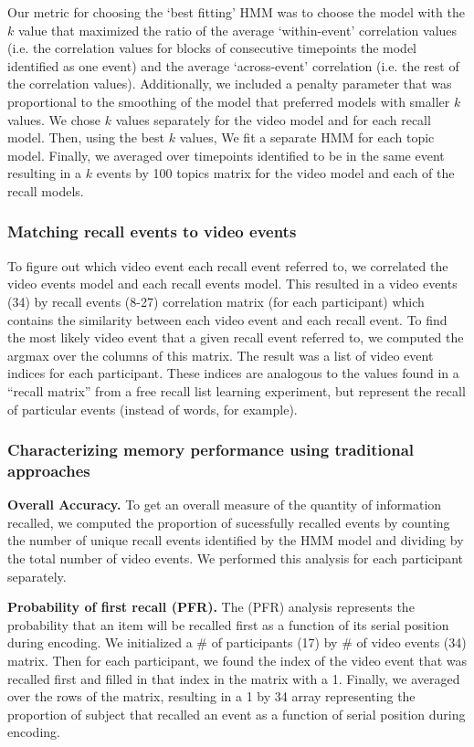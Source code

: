 \documentclass{article}
\begin{document}
{Our metric for choosing the `best fitting' HMM was to choose the model with the $k$ value that maximized the ratio of the average `within-event' correlation values (i.e. the correlation values for blocks of consecutive timepoints the model identified as one event) and the average `across-event' correlation (i.e. the rest of the correlation values). Additionally, we included a penalty parameter that was proportional to the smoothing of the model that preferred models with smaller $k$ values. We chose $k$ values separately for the video model and for each recall model.  Then, using the best $k$ values, We fit a separate HMM for each topic model. Finally, we averaged over timepoints identified to be in the same event resulting in a $k$ events by 100 topics matrix for the video model and each of the recall models.
%
\subsubsection{Matching recall events to video events}
To figure out which video event each recall event referred to, we correlated the video events model and each recall events model. This resulted in a video events (34) by recall events (8-27) correlation matrix (for each participant) which contains the similarity between each video event and each recall event.  To find the most likely video event that a given recall event referred to, we computed the argmax over the columns of this matrix.  The result was a list of video event indices for each participant. These indices are analogous to the values found in a ``recall matrix'' from a free recall list learning experiment, but represent the recall of particular events (instead of words, for example).
%
\subsubsection{Characterizing memory performance using traditional approaches}

\textbf{Overall Accuracy.}  To get an overall measure of the quantity of information recalled, we computed the proportion of sucessfully recalled events by counting the number of unique recall events identified by the HMM model and dividing by the total number of video events.  We performed this analysis for each participant separately.

\textbf{Probability of first recall (PFR).}  The (PFR) analysis represents the probability that an item will be recalled first as a function of its serial position during encoding. We initialized a \# of participants (17) by \# of video events (34) matrix. Then for each participant, we found the index of the video event that was recalled first and filled in that index in the matrix with a 1.  Finally, we averaged over the rows of the matrix, resulting in a 1 by 34 array representing the proportion of subject that recalled an event as a function of serial position during encoding.

}
\end{document}

